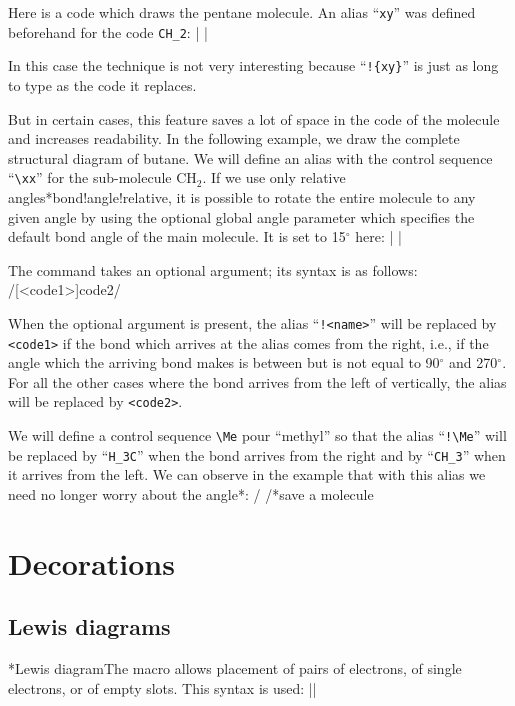 \documentclass[10pt]{article}
\makeatletter
\newcommand\idx{\@ifstar{\let\print@or@not\@gobble\idx@}{\let\print@or@not\@firstofone\idx@}}
\newcommand\idx@[1]{%
	\ifcat\expandafter\noexpand\@car#1\@nil\relax%
		\expandafter\ifx\@car#1\@nil\protect
			\index{#1}%
			\print@or@not{#1}%
		\else
			\saveexpandmode\expandarg
			\StrSubstitute{\string#1}{\string @}{\@empty\protect\symbol{'100}}[\temp@]%
			\StrGobbleLeft\temp@1[\temp@]%
			\restoreexpandmode
			\expandafter\index\expandafter{\temp@ @\protect\texttt{\protect\textbackslash\temp@}}%
			\print@or@not{\texttt{\string#1}}%
		\fi
	\else
		\index{#1}%
		\print@or@not{#1}%
	\fi
}
\newcommand\make@car@active[1]{%
	\catcode`#1\active
	\begingroup
		\lccode`\~`#1\relax
		\lowercase{\endgroup\def~}%
}
\newif\if@exstar
\newcommand\exemple{%
	\begingroup
	\parskip\z@
	\@makeother\;\@makeother\!\@makeother\?\@makeother\:%
	\@ifstar{\@exstartrue\exemple@}{\@exstarfalse\exemple@}}
\newcommand\exemple@[2][65]{%
	\medbreak\noindent
	\begingroup
		\let\do\@makeother\dospecials
		\make@car@active\ { {}}%
		\make@car@active\^^M{\par\leavevmode}%
		\make@car@active\,{\leavevmode\kern\z@\string,}%
		\make@car@active\-{\leavevmode\kern\z@\string-}%
		\make@car@active\>{\leavevmode\kern\z@\string>}%
		\make@car@active\<{\leavevmode\kern\z@\string<}%
		\exemple@@{#1}{#2}%
}
\newcommand\exemple@@[3]{%
	\def\@tempa##1#3{\exemple@@@{#1}{#2}{##1}}%
	\@tempa
}
\newcommand\exemple@@@[3]{%
	\xdef\the@code{#3}%
	\endgroup
	\if@exstar
		\begingroup
			\fboxrule0.4pt
			\let\breakboxparindent\z@
			\def\bkvz@bottom{\hrule\@height\fboxrule}%
			\let\bkvz@before@breakbox\relax
			\def\bkvz@set@linewidth{\advance\linewidth\dimexpr-2\fboxrule-2\fboxsep}%
			\def\bkvz@left{\vrule\@width\fboxrule\hskip\fboxsep}%
			\def\bkvz@right{\hskip\fboxsep\vrule\@width\fboxrule}%
			\def\bkvz@top{\hbox to \hsize{%
				\vrule\@width\fboxrule\@height\fboxrule
				\leaders\bkvz@bottom\hfill
				\ECFAugie
				\fboxsep\z@
				\colorbox{black}{\kern0.25em\color{white}\footnotesize\lower0.5ex\hbox{\strut#2}\kern0.25em}%
				\leaders\bkvz@bottom\hfill
				\vrule\@width\fboxrule\@height\fboxrule}}%
			\breakbox
				\kern.5ex\relax
				\ttfamily\footnotesize\the@code\par
				\normalfont
				\kern3pt
				\hrule height0.1pt width\linewidth depth0.1pt
				\vskip5pt
				\rightskip0pt plus 1fill
				\everypar{{\color{lightgray}\rlap{\vrule height0.1pt width\linewidth depth0.1pt}}\hskip0pt plus 1fill}%
				\newlinechar`\^^M\everyeof{\noexpand}\scantokens{#3}\par
			\endbreakbox
		\endgroup
	\else
		\vskip0.5ex
		\boxput*(0,1)
			{\fboxsep\z@
			\hbox{\ECFAugie\colorbox{black}{\leavevmode\kern0.25em{\color{white}\footnotesize\strut#2}\kern0.25em}}%
			}%
			{\fboxsep5pt
			\fbox{%
				$\vcenter{\hsize\dimexpr0.#1\linewidth-\fboxsep-\fboxrule\relax
					\kern5pt\parskip0pt \ttfamily\footnotesize\the@code}%
				\vcenter{\kern5pt\hsize\dimexpr\linewidth-0.#1\linewidth-\fboxsep-\fboxrule\relax
					\everypar{{\color{lightgray}\rlap{\vrule height0.1pt width\dimexpr\linewidth-0.#1\linewidth-\fboxsep-\fboxrule depth0.1pt}}}%
					\footnotesize\newlinechar`\^^M\everyeof{\noexpand}\scantokens{#3}}$%
				}%
			}%
	\fi
	\medbreak
	\endgroup
}
\let\do\@makeother\dospecials
\def\degres{\ensuremath{{}^\circ}}
\makeatother
\begin{document}
Here is a code which draws the pentane molecule. An alias ``\verb/xy/'' was defined beforehand for the code \verb/CH_2/:
\exemple{Pentane}|
	|

In this case the technique is not very interesting because ``\verb/!{xy}/'' is just as long to type as the code it replaces.

But in certain cases, this feature saves a lot of space in the code of the molecule and increases readability. In the following example, we draw the complete structural diagram of butane. We will define an alias with the control sequence ``\verb/\xx/'' for the sub-molecule $\mathrm{CH_2}$. If we use only relative angles\idx*{bond!angle!relative}, it is possible to rotate the entire molecule to any given angle by using the optional global angle parameter which specifies the default bond angle of the main molecule. It is set to 15\degres{} here:
\exemple{Butane}|
|

The \idx{\definesubmol} command takes an optional argument; its syntax is as follows:
\centerverb/[<code1>]{code2}/
\medskip

When the optional argument is present, the alias ``\verb-!<name>-'' will be replaced by \verb'<code1>' if the bond which arrives at the alias comes from the right, i.e., if the angle which the arriving bond makes is between but is not equal to 90\degres{} and 270\degres{}. For all the other cases where the bond arrives from the left of vertically, the alias will be replaced by \verb-<code2>-.

We will define a control sequence \verb-\Me- pour ``methyl'' so that the alias ``\verb-!\Me-'' will be replaced by ``\verb-H_3C-'' when the bond arrives from the right and by ``\verb-CH_3-'' when it arrives from the left. We can observe in the example that with this alias we need no longer worry about the angle\idx*{}:
\exemple{Dual alias}/
/\idx*{save a molecule}

\section{Decorations}
\subsection{Lewis diagrams}\label{lewis}
\idx*{Lewis diagram}The macro \idx{\lewis} allows placement of pairs of electrons, of single electrons, or of empty slots. This syntax is used:
\centerverb||
\smallskip
\end{document}
